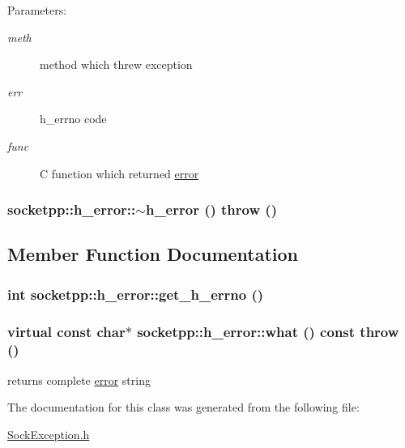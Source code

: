 \begin{Desc}
\item[Parameters:]
\begin{description}
\item[{\em meth}]method which threw exception \item[{\em err}]h\_\-errno code \item[{\em func}]C function which returned \hyperlink{classsocketpp_1_1error}{error} \end{description}
\end{Desc}
\hypertarget{classsocketpp_1_1h__error_56261f751b9080d0a67f282e7ab2974b}{
\subsubsection[{$\sim$h\_\-error}]{\setlength{\rightskip}{0pt plus 5cm}socketpp::h\_\-error::$\sim$h\_\-error ()  throw ()}}
\label{classsocketpp_1_1h__error_56261f751b9080d0a67f282e7ab2974b}




\subsection{Member Function Documentation}
\hypertarget{classsocketpp_1_1h__error_b2aabd50ea2f3189b09bc749a875e38f}{
\subsubsection[{get\_\-h\_\-errno}]{\setlength{\rightskip}{0pt plus 5cm}int socketpp::h\_\-error::get\_\-h\_\-errno ()}}
\label{classsocketpp_1_1h__error_b2aabd50ea2f3189b09bc749a875e38f}


\hypertarget{classsocketpp_1_1h__error_055c1a5b55b5d02fe81fd74cb8b900d2}{
\subsubsection[{what}]{\setlength{\rightskip}{0pt plus 5cm}virtual const char$\ast$ socketpp::h\_\-error::what () const  throw ()}}
\label{classsocketpp_1_1h__error_055c1a5b55b5d02fe81fd74cb8b900d2}


returns complete \hyperlink{classsocketpp_1_1error}{error} string 



The documentation for this class was generated from the following file:\begin{CompactItemize}
\item 
\hyperlink{SockException_8h}{SockException.h}\end{CompactItemize}
